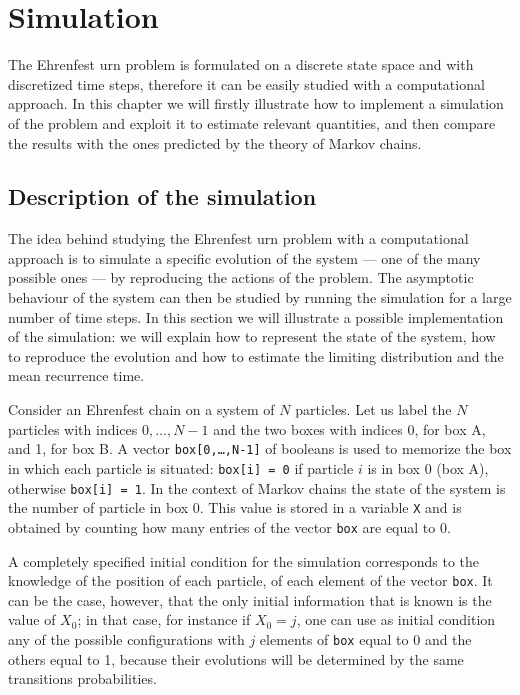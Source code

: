 \chapter{Simulation}
The Ehrenfest urn problem is formulated on a discrete state space and with discretized time steps, therefore it can be easily studied with a computational approach. In this chapter we will firstly illustrate how to implement a simulation of the problem and exploit it to estimate relevant quantities, and then compare the results with the ones predicted by the theory of Markov chains.

\section{Description of the simulation}
The idea behind studying the Ehrenfest urn problem with a computational approach is to simulate a specific evolution of the system --- one of the many possible ones --- by reproducing the actions of the problem. The asymptotic behaviour of the system can then be studied by running the simulation for a large number of time steps. In this section we will illustrate a possible implementation of the simulation: we will explain how to represent the state of the system, how to reproduce the evolution and how to estimate the limiting distribution and the mean recurrence time.

\medskip
Consider an Ehrenfest chain on a system of $N$ particles. Let us label the $N$ particles with indices $0, \dots,N-1$ and the two boxes with indices 0, for box A, and 1, for box B. A vector \texttt{box[0,\dots,N-1]} of booleans is used to memorize the box in which each particle is situated: \texttt{box[i] = 0} if particle $i$ is in box 0 (\ie box A), otherwise \texttt{box[i] = 1}. In the context of Markov chains the state of the system is the number of particle in box 0. This value is stored in a variable \texttt{X} and is obtained by counting how many entries of the vector \texttt{box} are equal to 0. 

A completely specified initial condition for the simulation corresponds to the knowledge of the position of each particle, \ie of each element of the vector \texttt{box}. It can be the case, however, that the only initial information that is known is the value of $X_0$; in that case, for instance if $X_0 = j$, one can use as initial condition any of the possible configurations with $j$ elements of \texttt{box} equal to 0 and the others equal to 1, because their evolutions will be determined by the same transitions probabilities.

